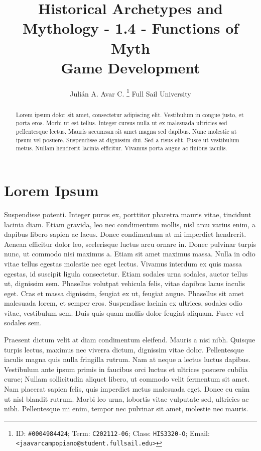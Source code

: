 \documentclass[10pt, letterpaper]{article}
\title{
	Historical Archetypes and Mythology - 1.4 - Functions of Myth\\
 	\large Game Development
}
\author{
	Julián A. Avar C. \thanks{
		ID: \texttt{\#0004984424};
		Term: \texttt{C202112-06};
		Class: \texttt{HIS3320-O};
		Email: \texttt{<jaavarcampopiano@student.fullsail.edu>}
	} \authorcr
	Full Sail University
}
\theoremstyle{definition}
\begin{document}
	\maketitle
	
	\begin{abstract}
		Lorem \autocite{name} ipsum dolor sit amet, consectetur adipiscing elit. Vestibulum in congue justo, et porta eros. Morbi ut est tellus. Integer cursus nulla ut ex malesuada ultricies sed pellentesque lectus. Mauris accumsan sit amet magna sed dapibus. Nunc molestie at ipsum vel posuere. Suspendisse at dignissim dui. Sed a risus elit. Fusce ut vestibulum metus. Nullam hendrerit lacinia efficitur. Vivamus porta augue ac finibus iaculis.
	\end{abstract}

	
	\section{Lorem Ipsum}
	
	
	Suspendisse potenti. Integer purus ex, porttitor pharetra mauris vitae, tincidunt lacinia diam. Etiam gravida, leo nec condimentum mollis, nisl arcu varius enim, a dapibus libero sapien ac lacus. Donec condimentum at mi imperdiet hendrerit. Aenean efficitur dolor leo, scelerisque luctus arcu ornare in. Donec pulvinar turpis nunc, ut commodo nisi maximus a. Etiam sit amet maximus massa. Nulla in odio vitae tellus egestas molestie nec eget lectus. Vivamus interdum ex quis massa egestas, id suscipit ligula consectetur. Etiam sodales urna sodales, auctor tellus ut, dignissim sem. Phasellus volutpat vehicula felis, vitae dapibus lacus iaculis eget. Cras et massa dignissim, feugiat ex ut, feugiat augue. Phasellus sit amet malesuada lorem, et semper eros. Suspendisse lacinia ex ultrices, sodales odio vitae, vestibulum sem. Duis quis quam mollis dolor feugiat aliquam. Fusce vel sodales sem.
	
	Praesent dictum velit at diam condimentum eleifend. Mauris a nisi nibh. Quisque turpis lectus, maximus nec viverra dictum, dignissim vitae dolor. Pellentesque iaculis magna quis nulla fringilla rutrum. Nam at neque a lectus luctus dapibus. Vestibulum ante ipsum primis in faucibus orci luctus et ultrices posuere cubilia curae; Nullam sollicitudin aliquet libero, ut commodo velit fermentum sit amet. Nam placerat sapien felis, quis imperdiet metus malesuada eget. Donec eu enim ut nisl blandit rutrum. Morbi leo urna, lobortis vitae vulputate sed, ultricies ac nibh. Pellentesque mi enim, tempor nec pulvinar sit amet, molestie nec mauris. 
	
	\clearpage
	
	
	\printbibliography[title = {Bibliography}]
	
	\tableofcontents
	
\end{document}
